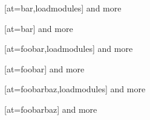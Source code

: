 \documentclass{article}
\begin{document}
\begin{module}[id=foo]
\begin{definition}
[at=bar,loadmodules] and more

[at=bar] and more

[at=foobar,loadmodules] and more

[at=foobar] and more

[at=foobarbaz,loadmodules] and more 

[at=foobarbaz] and more
\end{definition}
\end{module}
\end{document}
